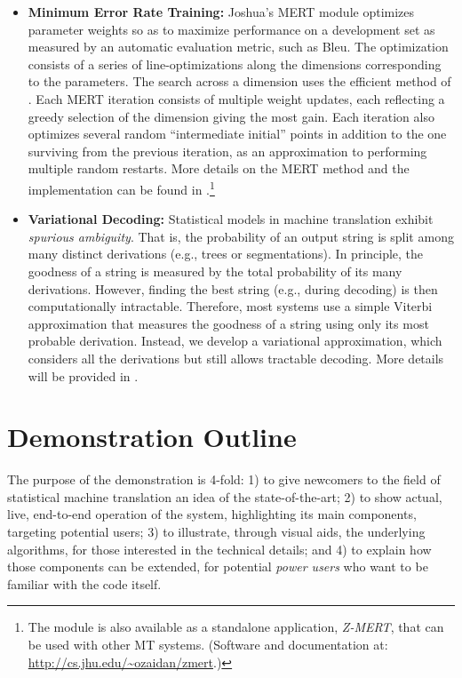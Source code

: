 \documentclass[11pt]{article}
\begin{document}
\begin{itemize}
\item \textbf{Minimum Error Rate Training:} Joshua's MERT module optimizes parameter weights so as to maximize performance on a development set as measured by an automatic evaluation metric, such as Bleu. The optimization consists of a series of line-optimizations along the dimensions corresponding to the parameters. The search across a dimension uses the efficient method of . Each MERT iteration consists of multiple weight updates, each reflecting a greedy selection of the dimension giving the most gain. Each iteration also optimizes several random ``intermediate initial'' points in addition to the one surviving from the previous iteration, as an approximation to performing multiple random restarts. More details on the MERT method and the implementation can be found in .\footnote{The module is also available as a standalone application, {\em Z-MERT}, that can be used with other MT systems. (Software and documentation at: \url{http://cs.jhu.edu/~ozaidan/zmert}.)}



\item \textbf{Variational Decoding:} Statistical models in machine translation exhibit \emph{spurious ambiguity}. That is, the probability of an output string is split among many distinct derivations (e.g., trees or segmentations).  In principle, the goodness of a string is measured by the total probability of its many derivations.  However, finding the best string (e.g., during decoding) is then computationally intractable. Therefore, most systems use a simple Viterbi approximation that measures the goodness of a string using only its most probable derivation.  Instead, we develop a variational approximation, which considers all the derivations but still allows tractable decoding.  More details will be provided in .
\end{itemize}

\section{Demonstration Outline}

The purpose of the demonstration is 4-fold: 1) to give newcomers to the field
of statistical machine translation an idea of the state-of-the-art; 2) to show
actual, live, end-to-end operation of the system,
highlighting its main components, targeting potential users; 3) to illustrate,
through visual aids, the underlying algorithms, for those interested in the
technical details; and 4) to explain how those components can be extended, for
potential \emph{power users} who want to be familiar with the code itself.
\end{document}
